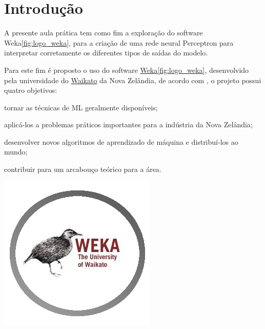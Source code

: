 
\section{Introdução}

\noindent \begin{minipage}[c]{0.6\textwidth}
  \vspace {1cm}
  \par A presente aula prática tem como fim a exploração do software Weka\ref{fig:logo_weka}, para a criação de uma rede neural Perceptron para interpretar corretamente os diferentes tipos de saídas do modelo.
  \par Para este fim é proposto o uso do software \href{https://www.cs.waikato.ac.nz/ml/index.html}{Weka}\ref{fig:logo_weka}, desenvolvido pela universidade do \href{https://www.waikato.ac.nz/}{Waikato} da Nova Zelândia, de acordo com , o projeto possui quatro objetivos:
  \begin{asparaenum}
    \item tornar as técnicas de ML geralmente disponíveis;
    \item aplicá-los a problemas práticos importantes para a indústria da Nova Zelândia;
    \item desenvolver novos algoritmos de aprendizado de máquina e distribuí-los ao mundo;
    \item contribuir para um arcabouço teórico para a área.
  \end{asparaenum}

\end{minipage}
\begin{minipage}[c]{0.4\textwidth}

  \includegraphics[width=\textwidth]{figure/weka-logo.jpg}
  	\label{fig:logo_weka}
\end{minipage}


